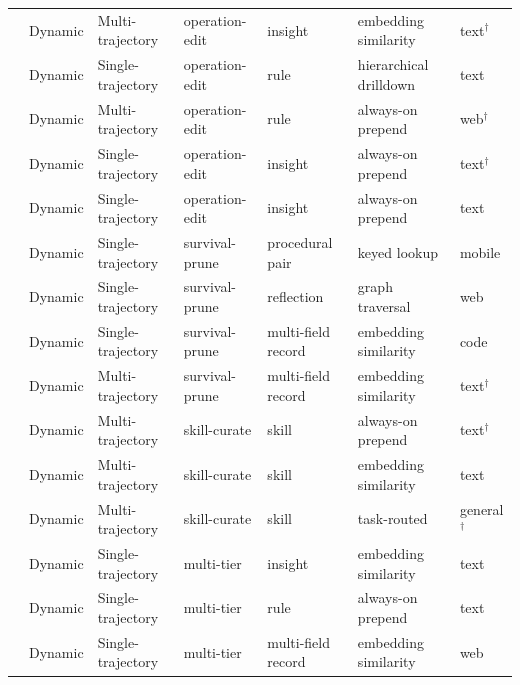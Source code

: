 \begin{table}[htbp]
{\begin{tabular}{@{}lllllll@{}}
\cite{Zha23c}  & Dynamic & Multi-trajectory  & operation-edit & insight           & embedding similarity & text$^\dagger$          \\
\cite{Ye25b}   & Dynamic & Single-trajectory & operation-edit & rule              & hierarchical drilldown & text                  \\
\cite{Che24}   & Dynamic & Multi-trajectory  & operation-edit & rule              & always-on prepend    & web$^\dagger$           \\
\cite{Zha25f}  & Dynamic & Single-trajectory & operation-edit & insight           & always-on prepend    & text$^\dagger$          \\
\cite{Suz25}   & Dynamic & Single-trajectory & operation-edit & insight           & always-on prepend    & text                    \\
\addlinespace[3pt]
\cite{Mi26b}   & Dynamic & Single-trajectory & survival-prune & procedural pair   & keyed lookup         & mobile                  \\
\cite{Hua25e}  & Dynamic & Single-trajectory & survival-prune & reflection        & graph traversal      & web                     \\
\cite{Cao25}   & Dynamic & Single-trajectory & survival-prune & multi-field record& embedding similarity & code                    \\
\cite{Su25}    & Dynamic & Multi-trajectory  & survival-prune & multi-field record& embedding similarity & text$^\dagger$          \\
\addlinespace[3pt]
\cite{Ni26}    & Dynamic & Multi-trajectory  & skill-curate   & skill             & always-on prepend    & text$^\dagger$          \\
\cite{Yan26}   & Dynamic & Multi-trajectory  & skill-curate   & skill             & embedding similarity & text                    \\
\cite{Ma26b}   & Dynamic & Multi-trajectory  & skill-curate   & skill             & task-routed          & general$^\dagger$       \\
\addlinespace[3pt]
\cite{Ma25}    & Dynamic & Single-trajectory & multi-tier     & insight           & embedding similarity & text                    \\
\cite{Maj23}   & Dynamic & Single-trajectory & multi-tier     & rule              & always-on prepend    & text                    \\
\cite{Liu25}   & Dynamic & Single-trajectory & multi-tier     & multi-field record& embedding similarity & web                     \\
\bottomrule
\end{tabular}%
}
\end{table}